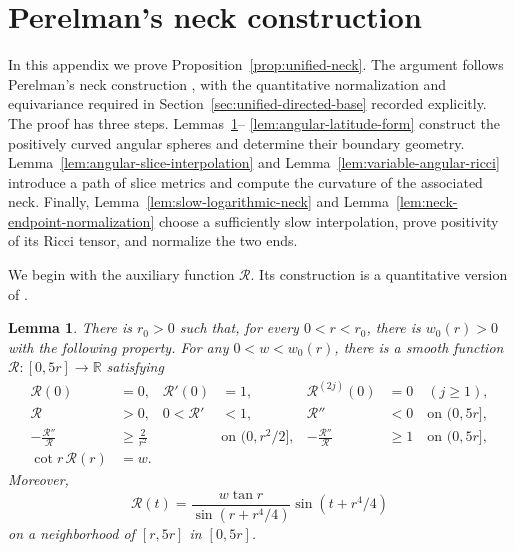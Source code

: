 \documentclass[11pt,reqno]{amsart}
\newtheorem{lemma}[theorem]{Lemma}
\theoremstyle{definition}
\numberwithin{equation}{section}
\begin{document}
\appendix
\section{Perelman's neck construction}\label{app:perelman-neck}
In this appendix we prove Proposition~\ref{prop:unified-neck}.  The
argument follows Perelman's neck construction
\cite[Assertion and Section~3]{Perelman1997}, with the quantitative
normalization and equivariance required in
Section~\ref{sec:unified-directed-base} recorded explicitly.  The proof
has three steps.  Lemmas~\ref{lem:concave-warping}--
\ref{lem:angular-latitude-form} construct the positively curved angular
spheres and determine their boundary geometry.
Lemma~\ref{lem:angular-slice-interpolation} and
Lemma~\ref{lem:variable-angular-ricci} introduce a path of slice metrics
and compute the curvature of the associated neck.  Finally,
Lemma~\ref{lem:slow-logarithmic-neck} and
Lemma~\ref{lem:neck-endpoint-normalization} choose a sufficiently slow
interpolation, prove positivity of its Ricci tensor, and normalize the
two ends.

We begin with the auxiliary function \(\mathcal R\).  Its construction
is a quantitative version of \cite[Section~3]{Perelman1997}.

\begin{lemma}\label{lem:concave-warping}
There is $r_0>0$ such that, for every $0<r<r_0$, there is $w_0(r)>0$
with the following property.  For any $0<w<w_0(r)$, there is a smooth
function $\mathcal R:[0,5r]\to\mathbb R$ satisfying
\begin{align}
 \mathcal R(0)&=0,& \mathcal R'(0)&=1,&
 \mathcal R^{(2j)}(0)&=0\quad(j\ge1),                              \label{eq:unified-base-3-2}\\
 \mathcal R&>0,&0<\mathcal R'&<1,&\mathcal R''&<0
                         \quad\text{on }(0,5r],                    \label{eq:unified-base-3-3}\\
 -\frac{\mathcal R''}{\mathcal R}&\ge \frac2{r^2}
                         &&\text{on }(0,r^2/2],&
 -\frac{\mathcal R''}{\mathcal R}&\ge1
                         \quad\text{on }(0,5r],                    \label{eq:unified-base-3-4}\\
 \cot r\,\mathcal R(r)&=w.                                        \label{eq:unified-base-3-5}
\end{align}
Moreover,
\begin{equation}
\mathcal R(t)=\frac{w\tan r}{\sin(r+r^4/4)}
                  \sin(t+r^4/4)                                  \label{eq:unified-base-3-6}
\end{equation}
on a neighborhood of $[r,5r]$ in $[0,5r]$.
\end{lemma}
\end{document}
